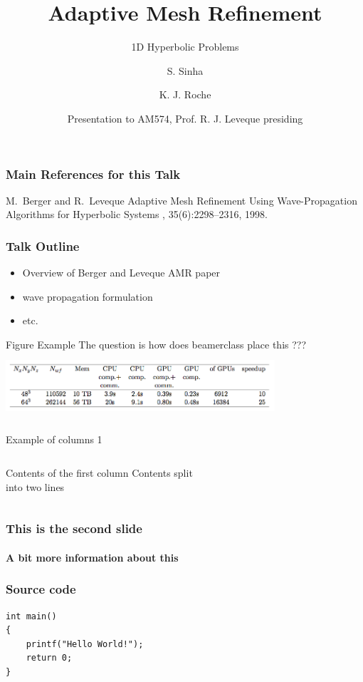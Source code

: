 \documentclass{beamer}
\title[Crisis] %
{Adaptive Mesh Refinement}
\subtitle{1D Hyperbolic Problems}
\author[Author, A] %
{S. Sinha\inst{1} \and K. J. Roche\inst{1,2}}
\institute[Universities Here and There] %
{
  \inst{1}%
  Department of Applied Mathematics\\
  University of Washington
  \and
  \inst{2}%
  High Performance Computing\\
  Pacific Northwest National Laboratory
}
\date[KPT 2004] %
{Presentation to AM574, Prof. R. J. Leveque presiding}
\begin{document}
\frame{\titlepage}
  
  \begin{frame}[allowframebreaks]
  \frametitle<presentation>{Main References for this Talk}    
  \begin{thebibliography}{10}    
  \beamertemplatearticlebibitems
    M.~Berger and R.~Leveque 
    \newblock Adaptive Mesh Refinement Using Wave-Propagation Algorithms for Hyperbolic Systems
    , 35(6):2298--2316, 1998.
  \end{thebibliography}
\end{frame}

  \begin{frame}
    \frametitle{Talk Outline}
    \begin{itemize}
    \item{Overview of Berger and Leveque AMR paper}
    \item{wave propagation formulation}
    \item{etc.}
    \end{itemize}
  \end{frame}
  
  \begin{frame}{Figure Example}
  The question is how does beamerclass place this ???
          \includegraphics[height=2.5cm,width=10cm]{corrected-titan-4cmp-abm-cpu-gpu.png}
\end{frame}

  \begin{frame}{Example of columns 1}
    \begin{columns}[c] %
     Contents of the first column
     Contents split \\ into two lines
    \end{columns}
\end{frame}
  
  \begin{frame}
    \frametitle{This is the second slide}
    \framesubtitle{A bit more information about this}
  \end{frame}
  \begin{frame}[fragile]

\frametitle{Source code}
 
\begin{lstlisting}[caption=First C example]
int main()
{
    printf("Hello World!");
    return 0;
}
\end{lstlisting}
\end{frame}
\end{document}
